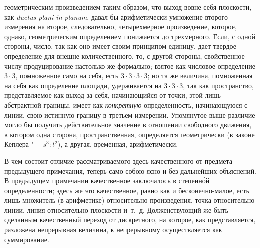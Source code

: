 геометрическим произведением таким образом, что выход вовне себя плоскости,
как {\em ductus plani in planum}, давал бы
арифметически умножение второго измерения на второе, следовательно,
четырехмерное произведение, которое, однако, геометрическим определением
понижается до трехмерного. Если, с одной стороны, число, так как оно имеет
своим принципом единицу, дает твердое определение для внешне
количественного, то, с другой стороны, свойственное числу продуцирование
настолько же формально; взятое как числовое определение $3 \cdot 3$,
помноженное само на себя, есть $3 \cdot 3 \cdot 3 \cdot 3$; но та же
величина, помноженная на себя как определение площади, удерживается
на $3 \cdot 3 \cdot 3$, так как пространство,
представляемое как выход за себя, начинающийся от точки, этой лишь
абстрактной границы, имеет как {\em конкретную}
определенность, начинающуюся с линии, свою истинную границу в третьем
измерении. Упомянутое выше различие могло бы получить действительное
значение в отношении свободного движения, в котором одна сторона,
пространственная, определяется геометрически (в законе Кеплера "---
$s^3 : t^2$), а другая, временная, арифметически.

В чем состоит отличие рассматриваемого здесь качественного от предмета
предыдущего примечания, теперь само собою ясно и без дальнейших объяснений.
В предыдущем примечании качественное заключалось в степенн\'{о}й
определенности; здесь же это качественное, равно как и бесконечно-малое,
есть лишь множитель (в арифметике) относительно произведения, точка
относительно линии, линия относительно плоскости и~т.~д. Долженствующий же
быть сделанным качественный переход от дискретного, на которое, как
представляется, разложена непрерывная величина, к непрерывному
осуществляется как суммирование.

